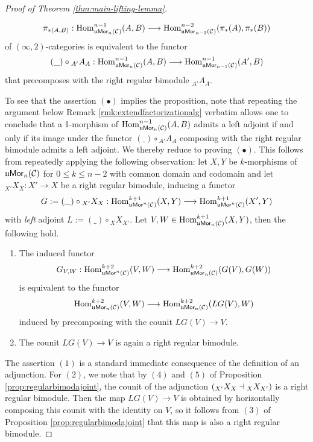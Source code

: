 \documentclass[10pt, reqno, twoside
, final
]{amsart}
\numberwithin{equation}{subsection}%
\theoremstyle{definition}
\theoremstyle{definition}
\theoremstyle{definition}
\theoremstyle{definition}
\theoremstyle{definition}
\theoremstyle{definition}
\theoremstyle{definition}
\theoremstyle{definition}
\theoremstyle{definition}
\theoremstyle{plain}
\theoremstyle{definition}
\theoremstyle{plain}
\theoremstyle{definition}
\theoremstyle{plain}
\theoremstyle{definition}
\theoremstyle{definition}
\theoremstyle{plain}
\theoremstyle{plain}
\theoremstyle{definition}
\theoremstyle{plain}
\theoremstyle{plain}
\theoremstyle{plain}
\begin{document}
\begin{proof}[Proof of Theorem \ref{thm:main-lifting-lemma}]
\begin{enumerate}
    \[  \pi_{*(A,B)}: \mathrm{Hom}_{\mathfrak{u}\mathsf{Mor}_n(\mathcal{C})}^{n-1}(A,B)\longrightarrow  \mathrm{Hom}_{\mathfrak{u}\mathsf{Mor}_{n-2}(\mathcal{C})}^{n-2}(\pi_*(A),\pi_*(B))  \]
    of $(\infty,2)$-categories is equivalent to the functor 
    \[  (\_) \circ {}_{A'}A_A:\mathrm{Hom}_{\mathfrak{u}\mathsf{Mor}_n(\mathcal{C})}^{n-1}(A,B)\longrightarrow  \mathrm{Hom}_{\mathfrak{u}\mathsf{Mor}_{n-1}(\mathcal{C})}^{n-1}(A',B)  \]
    that precomposes with the right regular bimodule ${}_{A'}A_A$.
\end{enumerate}
To see that the assertion $(\bullet)$ implies the proposition, note that repeating the argument below Remark \ref{rmk:extendfactorizationalg} verbatim allows one to conclude that a 1-morphism of $\mathrm{Hom}_{\mathfrak{u}\mathsf{Mor}_n(\mathcal{C})}^{n-1}(A,B)$ admits a left adjoint if and only if its image under the functor $(\_)\circ {}_{A'}A_A$ composing with the right regular bimodule admits a left adjoint. We thereby reduce to proving $(\bullet)$. This follows from repeatedly applying the following observation: let $X,Y$ be $k$-morphisms of $\mathfrak{u}\mathsf{Mor}_n(\mathcal{C})$ for $0\leq k\leq n-2$ with common domain and codomain and let ${}_{X'}X_X:X'\rightarrow X$ be a right regular bimodule, inducing a functor
\[ G:=(\_)\circ {}_{X'}X_X: \mathrm{Hom}^{k+1}_{\mathfrak{u}\mathsf{Mor}^n(\mathcal{C})}(X,Y)\longrightarrow \mathrm{Hom}^{k+1}_{\mathfrak{u}\mathsf{Mor}^n(\mathcal{C})}(X',Y)\]
with \emph{left} adjoint $L:=(\_)\circ {}_{X}X_{X'}$.
Let $V,W\in\mathrm{Hom}^{k+1}_{\mathfrak{u}\mathsf{Mor}_n(\mathcal{C})}(X,Y)$, then the following hold.
\begin{enumerate}[(1)]
    \item The induced functor 
    \[  G_{V,W}:\mathrm{Hom}^{k+2}_{\mathfrak{u}\mathsf{Mor}^n(\mathcal{C})}(V,W)\longrightarrow \mathrm{Hom}^{k+2}_{\mathfrak{u}\mathsf{Mor}_n(\mathcal{C})}(G(V),G(W))  \]
    is equivalent to the functor
     \[  \mathrm{Hom}^{k+2}_{\mathfrak{u}\mathsf{Mor}_n(\mathcal{C})}(V,W)\longrightarrow \mathrm{Hom}^{k+2}_{\mathfrak{u}\mathsf{Mor}_n(\mathcal{C})}(LG(V),W)  \]
     induced by precomposing with the counit $LG(V)\rightarrow V$.
     \item The counit $LG(V)\rightarrow V$ is again a right regular bimodule. 
\end{enumerate}
The assertion $(1)$ is a standard immediate consequence of the definition of an adjunction. For $(2)$, we note that by $(4)$ and $(5)$ of Proposition \ref{prop:regularbimodajoint}, the counit of the adjunction $\left({}_{X'}X_X\dashv {}_XX_{X'}\right)$ is a right regular bimodule. Then the map $LG(V)\rightarrow V$ is obtained by horizontally composing this counit with the identity on $V$, so it follows from  $(3)$ of Proposition \ref{prop:regularbimodajoint} that this map is also a right regular bimodule. 
\end{proof}
\end{document}
